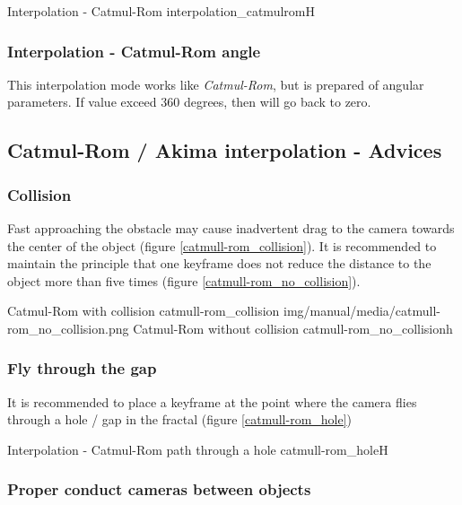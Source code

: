 {Interpolation - Catmul-Rom}
{interpolation_catmulrom}{H}

\subsubsection{Interpolation - Catmul-Rom
	angle}\label{interpolation-catmul-rom-angle}

This interpolation mode works like \emph{Catmul-Rom}, but is prepared of angular
parameters. If value exceed 360 degrees, then will go back to zero.

\subsection{Catmul-Rom / Akima interpolation -
	Advices}\label{catmul-rom-akima-interpolation---advices}

\subsubsection{Collision}\label{collision}

Fast approaching the obstacle may cause inadvertent drag to the camera towards
the center of the object (figure \ref{catmull-rom_collision}). It is recommended to maintain the principle that one
keyframe does not reduce the distance to the object more than five times (figure \ref{catmull-rom_no_collision}).

{Catmul-Rom with collision}
{catmull-rom_collision}
{img/manual/media/catmull-rom_no_collision.png}
{Catmul-Rom without collision}
{catmull-rom_no_collision}{h}

\subsubsection{Fly through the gap}\label{fly-through-the-gap}

It is recommended to place a keyframe at the point where the camera flies
through a hole / gap in the fractal (figure \ref{catmull-rom_hole})

{Interpolation - Catmul-Rom path through a hole}
{catmull-rom_hole}{H}

\subsubsection{Proper conduct cameras between
	objects}\label{proper-conduct-cameras-between-objects}


